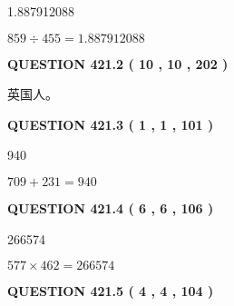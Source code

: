 \documentclass{ctexart}
\begin{document}
1.887912088
 
 
 
 
\noindent{}

$ %
859 \div  %
455=   %
1.887912088$
 
 
  
\vspace{0.2in}
  
{\textbf{\Large{QUESTION
421.2 
 ( 10 , 10 , 202 )
}}}
  
  
 
 
\noindent{}
 
 
英国人。
 
 
 
 
  
\vspace{0.2in}
  
{\textbf{\Large{QUESTION
421.3 
 ( 1 , 1 , 101 )
}}}
  
  
 
 
\noindent{}

940
 
 
 
 
\noindent{}

$ %
709 +  %
231=   %
940$
 
 
  
\vspace{0.2in}
  
{\textbf{\Large{QUESTION
421.4 
 ( 6 , 6 , 106 )
}}}
  
  
 
 
\noindent{}

266574
 
 
 
 
\noindent{}

$ %
577 \times  %
462=   %
266574$
 
 
  
\vspace{0.2in}
  
{\textbf{\Large{QUESTION
421.5 
 ( 4 , 4 , 104 )
}}}
  
  
 
 
\noindent{}
\end{document}
